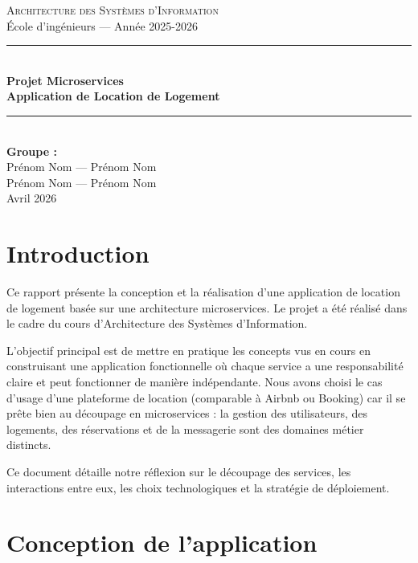 \documentclass[12pt, a4paper]{article}
\begin{document}
\begin{titlepage}
    \centering
    \vspace*{2cm}
    {\Large \textsc{Architecture des Systèmes d'Information}}\\[0.5cm]
    {\large École d'ingénieurs — Année 2025-2026}\\[2cm]
    \rule{\textwidth}{0.4pt}\\[0.6cm]
    {\Huge \bfseries Projet Microservices\\[0.3cm]
    Application de Location de Logement}\\[0.6cm]
    \rule{\textwidth}{0.4pt}\\[2cm]
    {\large
    \textbf{Groupe :}\\[0.3cm]
    Prénom Nom — Prénom Nom\\
    Prénom Nom — Prénom Nom\\
    }
    \vfill
    {\large Avril 2026}
\end{titlepage}

\tableofcontents
\newpage

\section{Introduction}

Ce rapport présente la conception et la réalisation d'une application de location de logement basée sur une architecture microservices. Le projet a été réalisé dans le cadre du cours d'Architecture des Systèmes d'Information.

L'objectif principal est de mettre en pratique les concepts vus en cours en construisant une application fonctionnelle où chaque service a une responsabilité claire et peut fonctionner de manière indépendante. Nous avons choisi le cas d'usage d'une plateforme de location (comparable à Airbnb ou Booking) car il se prête bien au découpage en microservices : la gestion des utilisateurs, des logements, des réservations et de la messagerie sont des domaines métier distincts.

Ce document détaille notre réflexion sur le découpage des services, les interactions entre eux, les choix technologiques et la stratégie de déploiement.

\section{Conception de l'application}
\end{document}
